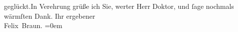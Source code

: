 \begin{ledgroupsized}[t]{13cm}
                  geglückt.\hspace*{1.5em}In Verehrung grüße ich Sie, werter Herr
               Doktor, und ſage nochmals wärmſten Dank.\pend
           \pstart
           Ihr ergebener{\\[\baselineskip]}\spacefill\mbox{Felix Braun.}\pend
           \leftskip=0em{}
         
         \endnumbering{}\end{ledgroupsized}  \newcommand{\dateiname}{L02458}\newcommand{\titel}{Felix Braun an Arthur Schnitzler, 14. 12. 1925}\newcommand{\editorInnen}{Martin Anton Müller und Gerd-Hermann Susen}
      